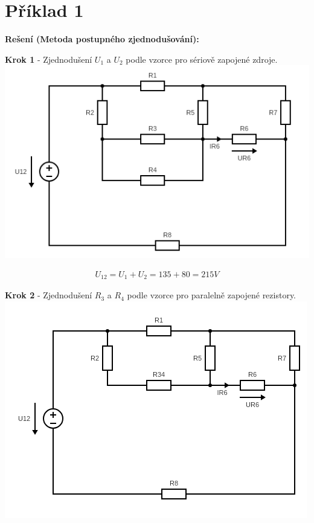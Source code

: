 \section{Příklad 1}

\vspace{1cm}
\large{\textbf{Rešení (Metoda postupného zjednodušování):}}

\begin{center}
\textbf{Krok 1} - Zjednodušení $U_1$ a $U_2$ podle vzorce pro sériově zapojené zdroje.
\includegraphics[scale=0.6,keepaspectratio]{fig/Pr1_steps/Pr1_step01.png} \\
\end{center}

\begin{gather*}
U_{12} = U_1 + U_2 = 135 + 80 = 215 V
\end{gather*}

\newpage

\begin{center}
\textbf{Krok 2} - Zjednodušení $R_3$ a $R_4$ podle vzorce pro paralelně zapojené rezistory.
\includegraphics[scale=0.6,keepaspectratio]{fig/Pr1_steps/Pr1_step02.png} \\
\end{center}
\vspace{-0.3cm}


